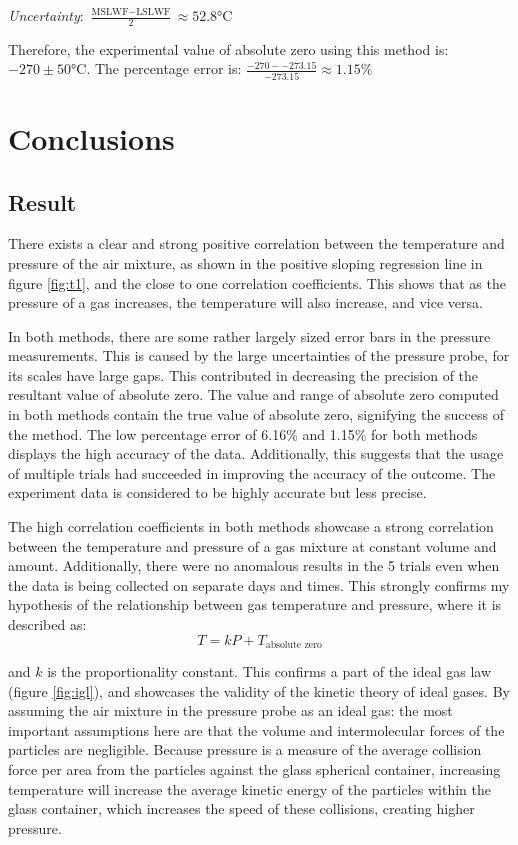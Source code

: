 \documentclass[a4paper,12pt]{article}
\begin{document}
\textit{Uncertainty}: $\frac{\text{MSLWF} - \text{LSLWF}}{2} \approx 52.8 \si{\celsius}$

Therefore, the experimental value of absolute zero using this method is: $-270 \pm 50 \si{\celsius}$. The percentage error is: $\frac{-270 - -273.15}{-273.15} \approx 1.15\%$

\section{Conclusions}
\subsection{Result}
There exists a clear and strong positive correlation between the temperature and pressure of the air mixture, as shown in the positive sloping regression line in figure \ref{fig:t1}, and the close to one correlation coefficients. This shows that as the pressure of a gas increases, the temperature will also increase, and vice versa.

In both methods, there are some rather largely sized error bars in the pressure measurements. This is caused by the large uncertainties of the pressure probe, for its scales have large gaps. This contributed in decreasing the precision of the resultant value of absolute zero.
The value and range of absolute zero computed in both methods contain the true value of absolute zero, signifying the success of the method. The low percentage error of 6.16\% and 1.15\% for both methods displays the high accuracy of the data. Additionally, this suggests that the usage of multiple trials had succeeded in improving the accuracy of the outcome. The experiment data is considered to be highly accurate but less precise.

The high correlation coefficients in both methods showcase a strong correlation between the temperature and pressure of a gas mixture at constant volume and amount. Additionally, there were no anomalous results in the 5 trials even when the data is being collected on separate days and times. This strongly confirms my hypothesis of the relationship between gas temperature and pressure, where it is described as:
\[
    T = kP + T_{\text{absolute zero}}
\]

and $k$ is the proportionality constant. This confirms a part of the ideal gas law (figure \ref{fig:igl}), and showcases the validity of the kinetic theory of ideal gases.
%
By assuming the air mixture in the pressure probe as an ideal gas: the most important assumptions here are that the volume and intermolecular forces of the particles are negligible. Because pressure is a measure of the average collision force per area from the particles against the glass spherical container, increasing temperature will increase the average kinetic energy of the particles within the glass container, which increases the speed of these collisions, creating higher pressure.
\end{document}
